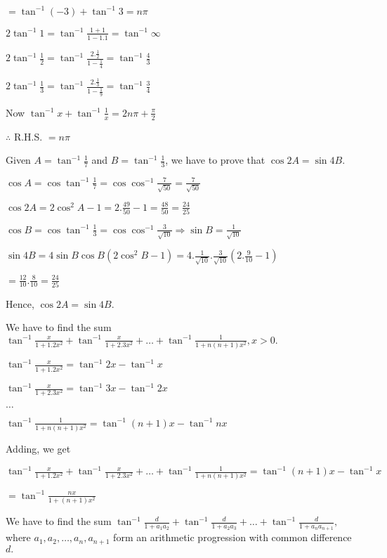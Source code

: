   $= \tan^{-1}(-3) + \tan^{-1}3 = n\pi$

  $2\tan^{-1}1 = \tan^{-1}\frac{1 + 1}{1 - 1.1} = \tan^{-1}\infty$

  $2\tan^{-1}\frac{1}{2} = \tan^{-1}\frac{2.\frac{1}{2}}{1 - \frac{1}{4}} = \tan^{-1}\frac{4}{3}$

  $2\tan^{-1}\frac{1}{3} = \tan^{-1}\frac{2.\frac{1}{3}}{1 - \frac{1}{9}} = \tan^{-1}\frac{3}{4}$

  Now $\tan^{-1}x + \tan^{-1}\frac{1}{x} = 2n\pi + \frac{\pi}{2}$

  $\therefore$ R.H.S. $= n\pi$

\item Given $A = \tan^{-1}\frac{1}{7}$ and $B = \tan^{-1}\frac{1}{3}$, we have to prove that $\cos 2A = \sin 4B$.

  $\cos A = \cos\tan^{-1}\frac{1}{7} = \cos\cos^{-1}\frac{7}{\sqrt{50}} = \frac{7}{\sqrt{50}}$

  $\cos2A = 2\cos^2A - 1 = 2.\frac{49}{50} - 1 = \frac{48}{50} = \frac{24}{25}$

  $\cos B = \cos\tan^{-1}\frac{1}{3} = \cos\cos^{-1}\frac{3}{\sqrt{10}} \Rightarrow \sin B = \frac{1}{\sqrt{10}}$

  $\sin4B = 4\sin B\cos B(2\cos^2B - 1) = 4.\frac{1}{\sqrt{10}}.\frac{3}{\sqrt{10}}\left(2.\frac{9}{10} - 1\right)$

  $= \frac{12}{10}.\frac{8}{10} = \frac{24}{25}$

  Hence, $\cos2A = \sin4B$.

\item We have to find the sum $\tan^{-1}\frac{x}{1 + 1.2x^2} + \tan^{-1}\frac{x}{1 + 2.3x^2} + \ldots + \tan^{-1}\frac{1}{1 +
  n(n + 1)x^2}, x> 0.$

  $\tan^{-1}\frac{x}{1 + 1.2x^2} = \tan^{-1}2x - \tan^{-1}x$

  $\tan^{-1}\frac{x}{1 + 2.3x^2} = \tan^{-1}3x - \tan^{-1}2x$

  $\ldots$

  $\tan^{-1}\frac{1}{1 + n(n + 1)x^2} = \tan^{-1}(n + 1)x - \tan^{-1}nx$

  Adding, we get

  $\tan^{-1}\frac{x}{1 + 1.2x^2} + \tan^{-1}\frac{x}{1 + 2.3x^2} + \ldots + \tan^{-1}\frac{1}{1 + n(n + 1)x^2} =
  \tan^{-1}(n + 1)x - \tan^{-1}x$

  $= \tan^{-1}\frac{nx}{1 + (n + 1)x^2}$

\item We have to find the sum $\tan^{-1}\frac{d}{1 + a_1a_2} + \tan^{-1}\frac{d}{1 + a_2a_3} + \ldots + \tan^{-1}\frac{d}{1 +
  a_na_{n + 1}},$ where $a_1, a_2, \ldots, a_n, a_{n + 1}$ form an arithmetic progression with common difference
  $d.$

